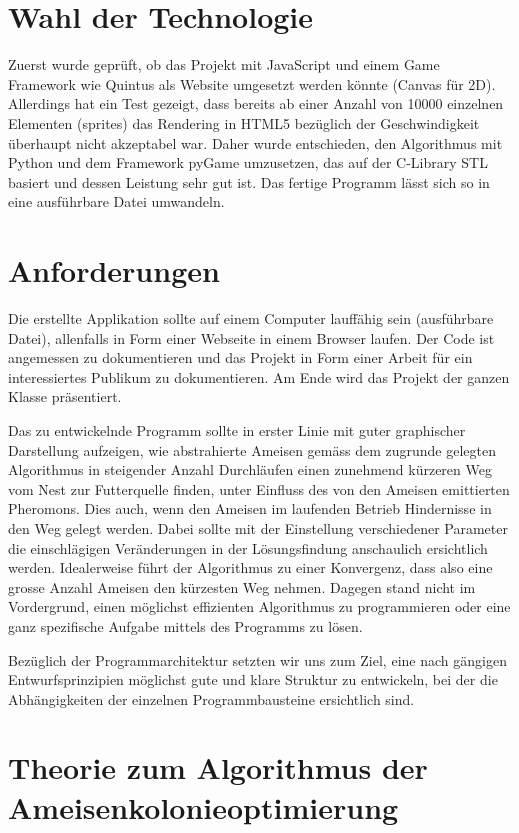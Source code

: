 \section{Wahl der Technologie}

Zuerst wurde geprüft, ob das Projekt mit JavaScript und einem Game Framework wie
Quintus als Website umgesetzt werden könnte (Canvas für 2D). Allerdings hat ein
Test gezeigt, dass bereits ab einer Anzahl von \num{10000} einzelnen Elementen
(sprites) das Rendering in HTML5 bezüglich der Geschwindigkeit überhaupt nicht
akzeptabel war. Daher wurde entschieden, den Algorithmus mit Python und dem
Framework pyGame umzusetzen, das auf der C-Library STL basiert und dessen
Leistung sehr gut ist. Das fertige Programm lässt sich so in eine ausführbare
Datei umwandeln.

\section{Anforderungen}

Die erstellte Applikation sollte auf einem Computer lauffähig sein (ausführbare
Datei), allenfalls in Form einer Webseite in einem Browser laufen. Der Code ist
angemessen zu dokumentieren und das Projekt in Form einer Arbeit für ein
interessiertes Publikum zu dokumentieren. Am Ende wird das Projekt der ganzen
Klasse präsentiert.

Das zu entwickelnde Programm sollte in erster Linie mit guter graphischer
Darstellung aufzeigen, wie abstrahierte Ameisen gemäss dem zugrunde gelegten
Algorithmus in steigender Anzahl Durchläufen einen zunehmend kürzeren Weg vom
Nest zur Futterquelle finden, unter Einfluss des von den Ameisen emittierten
Pheromons. Dies auch, wenn den Ameisen im laufenden Betrieb Hindernisse in den
Weg gelegt werden. Dabei sollte mit der Einstellung verschiedener Parameter die
einschlägigen Veränderungen in der Lösungsfindung anschaulich ersichtlich
werden. Idealerweise führt der Algorithmus zu einer Konvergenz, dass also eine
grosse Anzahl Ameisen den kürzesten Weg nehmen. Dagegen stand nicht im
Vordergrund, einen möglichst effizienten Algorithmus zu programmieren oder eine
ganz spezifische Aufgabe mittels des Programms zu lösen.

Bezüglich der Programmarchitektur setzten wir uns zum Ziel, eine nach gängigen
Entwurfsprinzipien möglichst gute und klare Struktur zu entwickeln, bei der die
Abhängigkeiten der einzelnen Programmbausteine ersichtlich sind.

\section{Theorie zum Algorithmus der Ameisenkolonieoptimierung}

